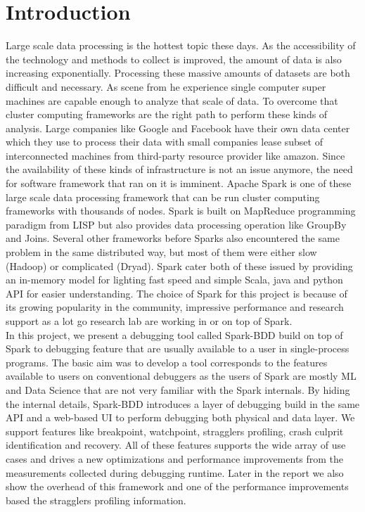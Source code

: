 \documentclass{acm_proc_article-sp}
\begin{document}
\section{Introduction}
Large scale data processing is the hottest topic these days. As the accessibility of the technology and methods to collect is improved, the amount of data is also increasing exponentially.
Processing these massive amounts of datasets are both difficult and necessary. As scene from he experience single computer super machines are capable enough to analyze that scale of data. To overcome that cluster computing frameworks are the right path to perform these kinds of analysis.  Large companies like Google and Facebook have their own data center which they use to process their data with small companies lease subset of interconnected machines from third-party resource provider like amazon. Since the availability of these kinds of infrastructure is not an issue anymore, the need for software framework that ran on it is imminent. Apache Spark is one of these large scale data processing framework that can be run cluster computing frameworks with thousands of nodes. Spark is built on MapReduce programming paradigm from LISP but also provides data processing operation like GroupBy and Joins. Several other frameworks before Sparks also encountered the same problem in the same distributed way, but most of them were either slow (Hadoop) or complicated (Dryad). Spark cater both of these issued by providing an in-memory model for lighting fast speed and simple Scala, java and python API for easier understanding. The choice of Spark for this project is because of its growing popularity in the community, impressive performance and research support as a lot go research lab are working in or on top of Spark.\\
In this project, we present a debugging tool called Spark-BDD build on top of Spark to debugging feature that are usually available to a user in single-process programs. The basic aim was to develop a tool corresponds to the features available to users on conventional debuggers as the users of Spark are mostly ML and Data Science that are not very familiar with the Spark internals. By hiding the internal details, Spark-BDD introduces a layer of debugging build in the same API and a web-based UI to perform debugging both physical and data layer. We support features like breakpoint, watchpoint, stragglers profiling, crash culprit identification and recovery. All of these features supports the wide array of use cases and drives a new optimizations and performance improvements from the measurements collected during debugging runtime. Later in the report we also show the overhead of this framework and one of the performance improvements based the stragglers profiling information. 
\end{document}
